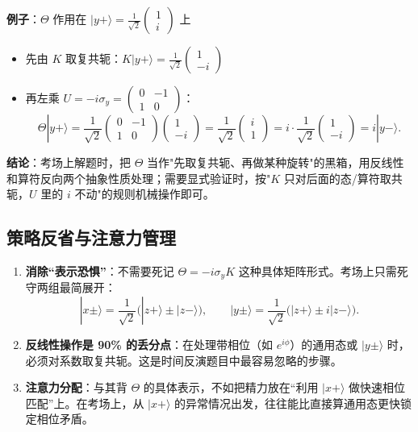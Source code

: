\textbf{例子}：$\Theta$ 作用在 $|y+\rangle = \frac{1}{\sqrt{2}}\begin{pmatrix}1\\i\end{pmatrix}$ 上
\begin{itemize}[nosep]
    \item 先由 $K$ 取复共轭：$K|y+\rangle = \frac{1}{\sqrt{2}}\begin{pmatrix}1\\-i\end{pmatrix}$
    \item 再左乘 $U = -i\sigma_y = \begin{pmatrix}0&-1\\1&0\end{pmatrix}$：
    \[
    \Theta|y+\rangle = \frac{1}{\sqrt{2}}\begin{pmatrix}0&-1\\1&0\end{pmatrix}\begin{pmatrix}1\\-i\end{pmatrix} = \frac{1}{\sqrt{2}}\begin{pmatrix}i\\1\end{pmatrix} = i \cdot \frac{1}{\sqrt{2}}\begin{pmatrix}1\\-i\end{pmatrix} = i|y-\rangle.
    \]
\end{itemize}

\textbf{结论}：考场上解题时，把 $\Theta$ 当作"先取复共轭、再做某种旋转"的黑箱，用反线性和算符反向两个抽象性质处理；需要显式验证时，按"$K$ 只对后面的态/算符取共轭，$U$ 里的 $i$ 不动"的规则机械操作即可。

\subsection{策略反省与注意力管理}

\begin{enumerate}[nosep]
    \item \textbf{消除``表示恐惧''}：不需要死记 $\Theta = -i\sigma_y K$ 这种具体矩阵形式。考场上只需死守两组最简展开：
    \[
    |x\pm\rangle = \frac{1}{\sqrt{2}}\bigl(|z+\rangle \pm |z-\rangle\bigr), \qquad |y\pm\rangle = \frac{1}{\sqrt{2}}\bigl(|z+\rangle \pm i|z-\rangle\bigr).
    \]
    \item \textbf{反线性操作是 90\% 的丢分点}：在处理带相位（如 $e^{i\phi}$）的通用态或 $|y\pm\rangle$ 时，必须对系数取复共轭。这是时间反演题目中最容易忽略的步骤。
    \item \textbf{注意力分配}：与其背 $\Theta$ 的具体表示，不如把精力放在``利用 $|x+\rangle$ 做快速相位匹配''上。在考场上，从 $|x+\rangle$ 的异常情况出发，往往能比直接算通用态更快锁定相位矛盾。
\end{enumerate}


